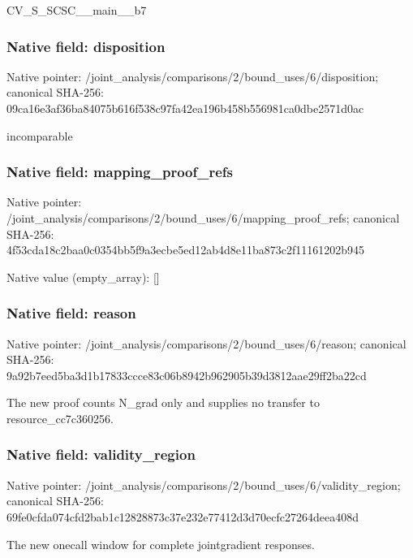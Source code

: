 \documentclass[10pt,a4paper]{article}
\begin{document}
CV\_S\_SCSC\_\_main\_\_b7


\subsubsection{Native field: disposition}


Native pointer: /joint\_analysis/comparis\allowbreak{}ons/2/bound\_uses/6/dispo\allowbreak{}sition; canonical SHA-256: 09ca16e3af36ba84075b616f\allowbreak{}538c97fa42ea196b458b5569\allowbreak{}81ca0dbe2571d0ac


incomparable


\subsubsection{Native field: mapping\_proof\_refs}


Native pointer: /joint\_analysis/comparis\allowbreak{}ons/2/bound\_uses/6/mappi\allowbreak{}ng\_proof\_refs; canonical SHA-256: 4f53cda18c2baa0c0354bb5f\allowbreak{}9a3ecbe5ed12ab4d8e11ba87\allowbreak{}3c2f11161202b945



Native value (empty\_array): []



\subsubsection{Native field: reason}


Native pointer: /joint\_analysis/comparis\allowbreak{}ons/2/bound\_uses/6/reaso\allowbreak{}n; canonical SHA-256: 9a92b7eed5ba3d1b17833ccc\allowbreak{}e83c06b8942b962905b39d38\allowbreak{}12aae29ff2ba22cd


The new proof counts N\_grad only and supplies no transfer to resource\_cc7c360256.


\subsubsection{Native field: validity\_region}


Native pointer: /joint\_analysis/comparis\allowbreak{}ons/2/bound\_uses/6/valid\allowbreak{}ity\_region; canonical SHA-256: 69fe0cfda074cfd2bab1c128\allowbreak{}28873c37e232e77412d3d70e\allowbreak{}cfc27264deea408d


The new onecall window for complete jointgradient responses.
\end{document}
